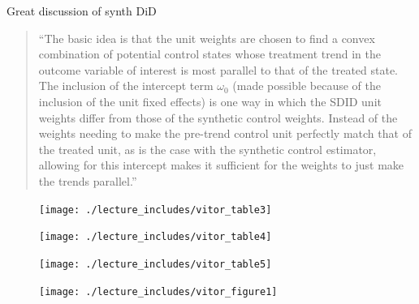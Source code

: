 \documentclass{beamer}
\begin{document}
\begin{frame}{Great discussion of synth DiD}


\begin{quote}
``The basic idea is that the unit weights are chosen to find a convex combination of potential control states whose treatment trend in the outcome variable of interest is most parallel to that of the treated state.  The inclusion of the intercept term $\omega_0$ (made possible because of the inclusion of the unit fixed effects) is one way in which the SDID unit weights differ from those of the synthetic control weights.  Instead of the weights needing to make the pre-trend control unit perfectly match that of the treated unit, as is the case with the synthetic control estimator, allowing for this intercept makes it sufficient for the weights to just make the trends parallel.''
\end{quote}

\end{frame}

\begin{frame}[plain]

	\begin{figure}
	\texttt{[image: ./lecture\_includes/vitor\_table3]}
	\end{figure}

\end{frame}


\begin{frame}[plain]

	\begin{figure}
	\texttt{[image: ./lecture\_includes/vitor\_table4]}
	\end{figure}

\end{frame}


\begin{frame}[plain]

	\begin{figure}
	\texttt{[image: ./lecture\_includes/vitor\_table5]}
	\end{figure}

\end{frame}


\begin{frame}[plain]

	\begin{figure}
	\texttt{[image: ./lecture\_includes/vitor\_figure1]}
	\end{figure}

\end{frame}
\end{document}
